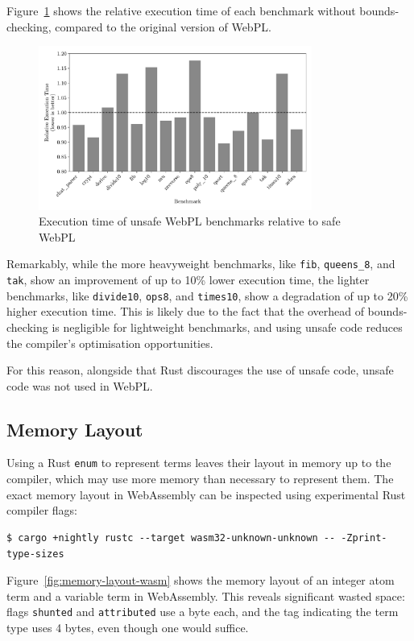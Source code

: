 Figure~\ref{fig:unsafe} shows the relative execution time of each benchmark without bounds-checking, compared to the original version of WebPL.

\begin{figure}[H]
\centering
\includegraphics[width=0.8\textwidth]{relative_performance_unsafe.pdf}
\caption{Execution time of unsafe WebPL benchmarks relative to safe WebPL}
\label{fig:unsafe}
\end{figure}

Remarkably, while the more heavyweight benchmarks, like \texttt{fib}, \texttt{queens\_8}, and \texttt{tak}, show an improvement of up to 10\% lower execution time, the lighter benchmarks, like \texttt{divide10}, \texttt{ops8}, and \texttt{times10}, show a degradation of up to 20\% higher execution time. This is likely due to the fact that the overhead of bounds-checking is negligible for lightweight benchmarks, and using unsafe code reduces the compiler's optimisation opportunities.

For this reason, alongside that Rust discourages the use of unsafe code, unsafe code was not used in WebPL.

\subsection{Memory Layout}

Using a Rust \texttt{enum} to represent terms leaves their layout in memory up to the compiler, which may use more memory than necessary to represent them. The exact memory layout in WebAssembly can be inspected using experimental Rust compiler flags:

\begin{verbatim}
$ cargo +nightly rustc --target wasm32-unknown-unknown -- -Zprint-type-sizes
\end{verbatim}

Figure~\ref{fig:memory-layout-wasm} shows the memory layout of an integer atom term and a variable term in WebAssembly. This reveals significant wasted space: flags \texttt{shunted} and \texttt{attributed} use a byte each, and the tag indicating the term type uses 4 bytes, even though one would suffice.

